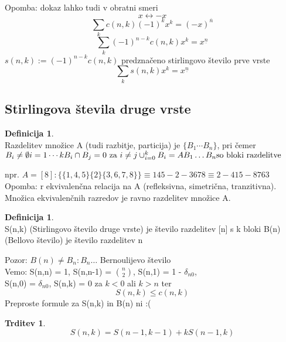\documentclass[a4paper,12pt]{article}
\theoremstyle{definition}
\newtheorem{defn}[counter]{Definicija}
\newtheorem{claim}[counter]{Trditev}
\theoremstyle{remark}
\begin{document}
Opomba: dokaz lahko tudi v obratni smeri \\
\[x \leftrightarrow -x\]
\[\sum_k c(n,k) (-1)^k x^k = (-x)^{\overline{n}}\]
\[\sum_k (-1)^{n-k} c(n,k) x^k = x^{\underline{n}}\]
$s(n,k) := (-1)^{n-k} c(n,k)$ predznačeno stirlingovo število prve vrste
\[\sum_k s(n,k) x^k = x^{\underline{n}}\]

\subsection{Stirlingova števila druge vrste}

\begin{defn}\mbox{}\\
    Razdelitev množice A (tudi razbitje, particija) je $\{B_1 \cdots B_n\}$, pri čemer
    \begin{math}
        B_i \neq \emptyset i = 1 \cdots k \\
        B_i \cap B_j = 0 \text{ za } i \neq j \\
        \cup_{i=0}^k B_i = A \\
        B_1 \dots B_n \text{so bloki razdelitve} \\
    \end{math}
\end{defn}

npr. $A = [8]: \{ \{1, 4, 5\} \{2\} \{3, 6, 7, 8\}\} \equiv 145-2-3678 \equiv 2-415-8763$ \\
Opomba: r ekvivalenčna relacija na A (refleksivna, simetrična, tranzitivna). Množica ekvivalenčnih
    razredov je ravno razdelitev množice A. \\

\begin{defn}\mbox{}\\
    S(n,k) (Stirlingovo število druge vrste) je število razdelitev [n] s k bloki
    B(n) (Bellovo število) je število razdelitev n
\end{defn}

Pozor: $B(n) \neq B_n: B_n \dots$ Bernoulijevo število \\
Vemo: S(n,n) = 1, S(n,n-1) = $\binom{n}{2}$, S(n,1) = 1 - $\delta_{n0}$, \\
S(n,0) = $\delta_{n0}$, S(n,k) = 0 za $k < 0$ ali $k > n$ ter
\[S(n,k) \leq c(n,k)\]
Preproste formule za S(n,k) in B(n) ni :(

\begin{claim}
    \[S(n, k) = S(n-1, k-1) + k S(n-1, k)\] 
\end{claim}
\end{document}
